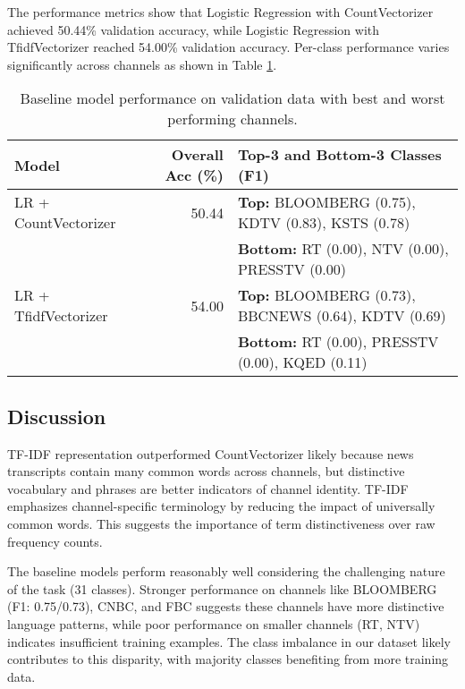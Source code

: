 \documentclass[11pt]{article}
\begin{document}
The performance metrics show that Logistic Regression with CountVectorizer achieved 50.44\% validation accuracy, while Logistic Regression with TfidfVectorizer reached 54.00\% validation accuracy. Per-class performance varies significantly across channels as shown in Table \ref{tab:baseline_results}.

\begin{table}
\centering
\begin{tabularx}{\textwidth}{lrX}
 \toprule
 Model & Overall Acc (\%) & Top-3 and Bottom-3 Classes (F1) \\
 \midrule
 LR + CountVectorizer & 50.44 & \textbf{Top:} BLOOMBERG (0.75), KDTV (0.83), KSTS (0.78) \\
                       &       & \textbf{Bottom:} RT (0.00), NTV (0.00), PRESSTV (0.00) \\
 \midrule
 LR + TfidfVectorizer & 54.00 & \textbf{Top:} BLOOMBERG (0.73), BBCNEWS (0.64), KDTV (0.69) \\
                       &       & \textbf{Bottom:} RT (0.00), PRESSTV (0.00), KQED (0.11) \\
 \bottomrule
\end{tabularx}
\caption{\label{tab:baseline_results} Baseline model performance on validation data with best and worst performing channels.}
\end{table}

\subsection{Discussion}

TF-IDF representation outperformed CountVectorizer likely because news transcripts contain many common words across channels, but distinctive vocabulary and phrases are better indicators of channel identity. TF-IDF emphasizes channel-specific terminology by reducing the impact of universally common words. This suggests the importance of term distinctiveness over raw frequency counts.

The baseline models perform reasonably well considering the challenging nature of the task (31 classes). Stronger performance on channels like BLOOMBERG (F1: 0.75/0.73), CNBC, and FBC suggests these channels have more distinctive language patterns, while poor performance on smaller channels (RT, NTV) indicates insufficient training examples. The class imbalance in our dataset likely contributes to this disparity, with majority classes benefiting from more training data.
\end{document}
